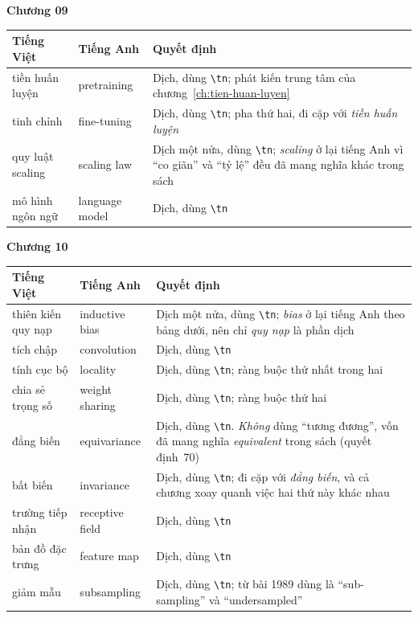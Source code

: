 \bigskip
\textbf{Chương 09}

\footnotesize
\begin{tabular}{@{}llp{4cm}@{}}
\toprule
Tiếng Việt & Tiếng Anh & Quyết định \\
\midrule
tiền huấn luyện & pretraining & Dịch, dùng \texttt{\textbackslash tn}; phát kiến trung tâm của chương~\ref{ch:tien-huan-luyen} \\
tinh chỉnh & fine-tuning & Dịch, dùng \texttt{\textbackslash tn}; pha thứ hai, đi cặp với \emph{tiền huấn luyện} \\
quy luật scaling & scaling law & Dịch một nửa, dùng \texttt{\textbackslash tn}; \emph{scaling} ở lại tiếng Anh vì \enquote{co giãn} và \enquote{tỷ lệ} đều đã mang nghĩa khác trong sách \\
mô hình ngôn ngữ & language model & Dịch, dùng \texttt{\textbackslash tn} \\
\bottomrule
\end{tabular}
\normalsize

\bigskip
\textbf{Chương 10}

\footnotesize
\begin{tabular}{@{}llp{4cm}@{}}
\toprule
Tiếng Việt & Tiếng Anh & Quyết định \\
\midrule
thiên kiến quy nạp & inductive bias & Dịch một nửa, dùng \texttt{\textbackslash tn}; \emph{bias} ở lại tiếng Anh theo bảng dưới, nên chỉ \emph{quy nạp} là phần dịch \\
tích chập & convolution & Dịch, dùng \texttt{\textbackslash tn} \\
tính cục bộ & locality & Dịch, dùng \texttt{\textbackslash tn}; ràng buộc thứ nhất trong hai \\
chia sẻ trọng số & weight sharing & Dịch, dùng \texttt{\textbackslash tn}; ràng buộc thứ hai \\
đẳng biến & equivariance & Dịch, dùng \texttt{\textbackslash tn}. \emph{Không} dùng \enquote{tương đương}, vốn đã mang nghĩa \emph{equivalent} trong sách (quyết định~70) \\
bất biến & invariance & Dịch, dùng \texttt{\textbackslash tn}; đi cặp với \emph{đẳng biến}, và cả chương xoay quanh việc hai thứ này khác nhau \\
trường tiếp nhận & receptive field & Dịch, dùng \texttt{\textbackslash tn} \\
bản đồ đặc trưng & feature map & Dịch, dùng \texttt{\textbackslash tn} \\
giảm mẫu & subsampling & Dịch, dùng \texttt{\textbackslash tn}; từ bài 1989 dùng là \enquote{sub-sampling} và \enquote{undersampled} \\
\bottomrule
\end{tabular}
\normalsize

